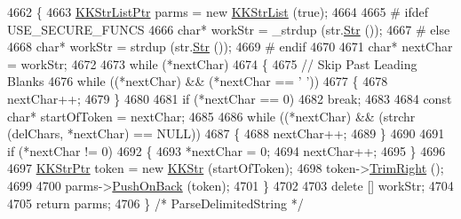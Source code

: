 \begin{DoxyCode}
4662 \{
4663   \hyperlink{class_k_k_b_1_1_k_k_str_list}{KKStrListPtr}  parms = \textcolor{keyword}{new} \hyperlink{class_k_k_b_1_1_k_k_str_list_ae8f27238b72887a795737931735ff802}{KKStrList} (\textcolor{keyword}{true});
4664 
4665 \textcolor{preprocessor}{# ifdef  USE\_SECURE\_FUNCS}
4666     \textcolor{keywordtype}{char}*  workStr =  \_strdup (str.\hyperlink{class_k_k_b_1_1_k_k_str_ad574e6c0fe7f6ce1ba3ab0a8ce2fbd52}{Str} ());
4667 \textcolor{preprocessor}{# else}
4668     \textcolor{keywordtype}{char}*  workStr =  strdup (str.\hyperlink{class_k_k_b_1_1_k_k_str_ad574e6c0fe7f6ce1ba3ab0a8ce2fbd52}{Str} ());
4669 \textcolor{preprocessor}{# endif}
4670 
4671   \textcolor{keywordtype}{char}*  nextChar = workStr;
4672 
4673   \textcolor{keywordflow}{while}  (*nextChar)
4674   \{
4675     \textcolor{comment}{// Skip Past Leading Blanks}
4676     \textcolor{keywordflow}{while}  ((*nextChar)  &&  (*nextChar == \textcolor{charliteral}{' '}))
4677     \{
4678       nextChar++;
4679     \}
4680 
4681     \textcolor{keywordflow}{if}  (*nextChar == 0)
4682       \textcolor{keywordflow}{break};
4683 
4684     \textcolor{keyword}{const} \textcolor{keywordtype}{char}*  startOfToken = nextChar;
4685 
4686     \textcolor{keywordflow}{while}  ((*nextChar)  &&  (strchr (delChars, *nextChar) == NULL))
4687     \{
4688       nextChar++;
4689     \}
4690 
4691     \textcolor{keywordflow}{if}  (*nextChar != 0)
4692     \{
4693       *nextChar = 0;
4694       nextChar++;
4695     \}
4696 
4697     \hyperlink{class_k_k_b_1_1_k_k_str}{KKStrPtr}  token = \textcolor{keyword}{new} \hyperlink{class_k_k_b_1_1_k_k_str}{KKStr} (startOfToken);
4698     token->\hyperlink{class_k_k_b_1_1_k_k_str_aa912161f17871e2d6fec7bbac033221c}{TrimRight} ();
4699 
4700     parms->\hyperlink{class_k_k_b_1_1_k_k_queue_aa9fba4632b54268bf71ecb42dee0b575}{PushOnBack} (token);
4701   \}
4702 
4703   \textcolor{keyword}{delete}  [] workStr;
4704 
4705   \textcolor{keywordflow}{return}  parms;
4706 \}  \textcolor{comment}{/* ParseDelimitedString */}
\end{DoxyCode}
